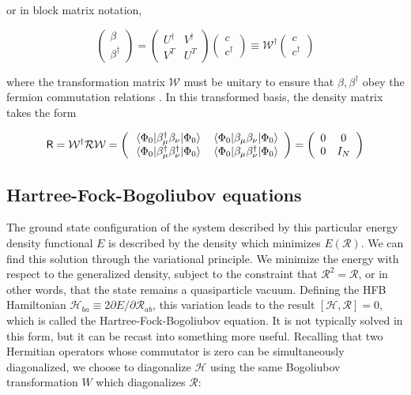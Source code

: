 \noindent or in block matrix notation,

\begin{equation}
\left(\begin{array}{c} \beta \\ \beta^\dagger\end{array}\right) = 
\left(\begin{array}{cc} U^\dagger & V^\dagger \\ V^T & U^T \end{array}\right)
\left(\begin{array}{c} c \\ c^\dagger\end{array}\right)
\equiv \mathcal{W}^\dagger \left(\begin{array}{c} c \\ c^\dagger\end{array}\right)
\end{equation}

\noindent where the transformation matrix $\mathcal{W}$ must be unitary to ensure that $\beta, \beta^\dagger$ obey the fermion commutation relations \cite{Ring1980}. In this transformed basis, the density matrix takes the form 

\begin{equation}
\mathsf{R} = \mathcal{W}^\dagger\mathcal{R}\mathcal{W} = 
\left(\begin{array}{cc}
\expval{\beta_\mu^\dagger \beta_\nu}{\Phi_0} & \expval{\beta_\mu \beta_\nu}{\Phi_0} \\
\expval{\beta_\mu^\dagger \beta_\nu^\dagger}{\Phi_0} & \expval{\beta_\mu \beta_\nu^\dagger}{\Phi_0}
\end{array}\right) = 
\left(\begin{array}{cc}
0 & 0 \\
0 & I_N
\end{array}\right)
\end{equation}


\subsection{Hartree-Fock-Bogoliubov equations}

The ground state configuration of the system described by this particular energy density functional $E$ is described by the density which minimizes $E(\mathcal{R})$. We can find this solution through the variational principle. We minimize the energy with respect to the generalized density, subject to the constraint that $\mathcal{R}^2=\mathcal{R}$, or in other words, that the state remains a quasiparticle vacuum. Defining the HFB Hamiltonian $\mathcal{H}_{ba} \equiv 2 \partial E/\partial \mathcal{R}_{ab}$, this variation leads to the result $\left[\mathcal{H},\mathcal{R}\right]=0$, which is called the Hartree-Fock-Bogoliubov equation. It is not typically solved in this form, but it can be recast into something more useful. Recalling that two Hermitian operators whose commutator is zero can be simultaneously diagonalized, we choose to diagonalize $\mathcal{H}$ using the same Bogoliubov transformation $W$ which diagonalizes $\mathcal{R}$:

